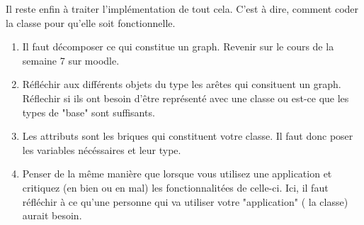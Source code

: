 \begin{Exercice}[15 minutes]
    Il reste enfin à traiter l'implémentation de tout cela. C'est à dire, comment coder la classe pour qu'elle soit fonctionnelle.
\begin{conseil}
   \begin{enumerate}
   \item Il faut décomposer ce qui constitue un graph. Revenir sur le cours de la semaine 7 sur moodle.
   \item Réfléchir aux différents objets du type les arêtes qui consituent un graph. Réflechir si ils ont besoin d'être représenté avec une classe ou est-ce que les types de "base" sont suffisants.
   \item Les attributs sont les briques qui constituent votre classe. Il faut donc poser les variables nécéssaires et leur type.
   \item Penser de la même manière que lorsque vous utilisez une application et critiquez (en bien ou en mal) les fonctionnalitées de celle-ci. Ici, il faut réfléchir à ce qu'une personne qui va utiliser votre "application" ( la classe) aurait besoin.
   \end{enumerate}
\end{conseil}
    

\end{Exercice}
